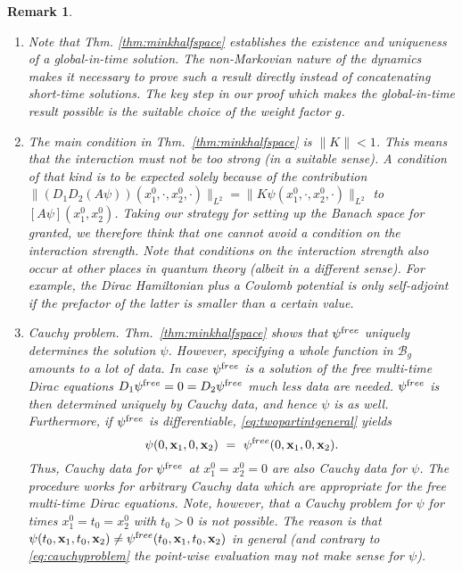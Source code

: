 \documentclass[b5paper,draft,openbib,12pt]{memoir}
\newtheorem{Remark}[Def]{Remark}
\newcommand{\vx}{\mathbf{x}}
\newcommand{\free}{{\textup free}}
\newcommand{\Banach}{\mathscr{B}}
\begin{document}
\begin{Remark}
\begin{enumerate}
%
  \item Note that Thm. \ref{thm:minkhalfspace} establishes 
  the existence and uniqueness of a global-in-time solution. 
  The non-Markovian nature of the dynamics makes it 
  necessary to prove such a result directly instead of 
  concatenating short-time solutions. The key step in our 
  proof which makes the global-in-time result possible is 
  the suitable choice of the weight factor $g$.
%
	\item The main condition in Thm.\ \ref{thm:minkhalfspace} is $\| K \| < 1$. This means that the interaction must not be too strong (in a suitable sense). A condition of that kind is to be expected solely because of the contribution $\| (D_1 D_2 (A \psi))(x_1^0,\cdot, x_2^0,\cdot)\|_{L^2} = \| K \psi(x_1^0,\cdot,x_2^0,\cdot)\|_{L^2}$ to $[A \psi](x_1^0,x_2^0)$. Taking our
strategy for setting up the Banach space for granted, we therefore think that one cannot avoid a condition on the interaction strength. Note that conditions on the interaction strength also occur at other places in quantum theory (albeit in a different sense). For example, the Dirac Hamiltonian plus a Coulomb potential is only self-adjoint if the prefactor of the latter is smaller than a certain value.
%
	\item \textit{Cauchy problem.} Thm.\ \ref{thm:minkhalfspace} shows that $\psi^\free$ uniquely determines the solution $\psi$. However, specifying a whole function in $\Banach_g$ amounts to a lot of data. In case $\psi^\free$ is a solution of the free multi-time Dirac equations $D_1 \psi^\free = 0 = D_2 \psi^\free$ much less data are needed. $\psi^\free$ is then determined uniquely by Cauchy data, and hence $\psi$ is as well. 
Furthermore, if $\psi^\free$ is differentiable, \eqref{eq:twopartintgeneral} yields
\begin{equation}
		\psi(0,\vx_1,0,\vx_2) ~=~ \psi^\free(0,\vx_1,0,\vx_2).
	\label{eq:cauchyproblem}
	\end{equation}
	Thus, Cauchy data for $\psi^\free$ at $x_1^0 = x_2^0 = 0$ are also Cauchy data for $\psi$. The procedure works for arbitrary Cauchy data which are appropriate for the free multi-time Dirac equations.  Note, however, that a Cauchy problem for $\psi$ for times $x_1^0 = t_0 = x_2^0$ with $t_0 > 0$ is not possible. The reason is that $\psi(t_0,\vx_1,t_0,\vx_2) \neq \psi^\free(t_0,\vx_1,t_0,\vx_2)$ in general (and contrary to \eqref{eq:cauchyproblem} the point-wise evaluation may not make sense for $\psi$).
\end{enumerate}

\end{Remark}
\end{document}
